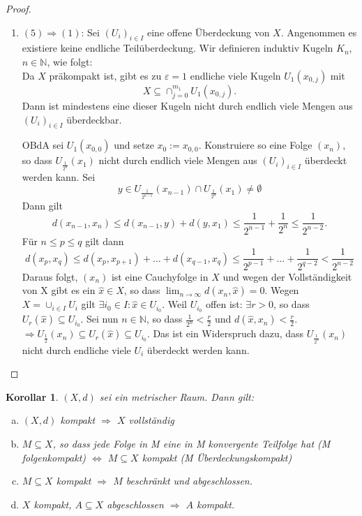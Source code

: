 \documentclass[ngerman]{report}
\theoremstyle{plain}%
\newtheorem{cor}[thm]{Korollar}
\theoremstyle{definition}%
\theoremstyle{myStyle}
\newcommand{\N}{\mathbb{N}}
\newcommand{\df}[1][]{%
	\overset{#1}{\Rightarrow}
}
\newcommand{\limes}[1][\infty]{\lim_{n \to #1}}
\newcommand{\qmarks}[1]{#1}
\begin{document}
\begin{proof}
\begin{enumerate}[]
		\item $(5) \df (1)$: 
			Sei $(U_i)_{i\in I}$ eine offene Überdeckung von $X$.
			Angenommen es existiere keine endliche Teilüberdeckung. Wir definieren induktiv Kugeln $K_n$, $n\in\N$, wie folgt:\\
			Da $X$ präkompakt ist, gibt es zu $\varepsilon = 1$ endliche viele Kugeln $U_1(x_{0,j})$ mit 
				$$X \subseteq \cap_{j=0}^{m_1} U_1(x_{0,j}).$$
			Dann ist mindestens eine dieser Kugeln nicht durch endlich viele Mengen aus $(U_i)_{i\in I}$ überdeckbar.\par
			OBdA sei $U_1(x_{0,0})$ und setze $x_0 := x_{0,0}$. 
			Konstruiere so eine Folge $(x_n)$, so dass $U_{\frac{1}{2^n}}(x_1)$ nicht durch endlich viele Mengen aus $(U_i)_{i\in I}$ überdeckt werden kann. 
			Sei 
				$$y \in U_{\frac{1}{2^{n-1}}}(x_{n-1}) \cap U_{\frac{1}{2^n}}(x_1) \neq \emptyset$$ 
			Dann gilt 
				$$d(x_{n-1},x_n) \leq d(x_{n-1},y) + d(y,x_1) \leq \frac{1}{2^{n-1}} + \frac{1}{2^n} \leq \frac{1}{2^{n-2}}.$$
			Für $n \leq p \leq q$ gilt dann 
				$$d(x_p,x_q) \leq d(x_p,x_{p+1}) + \dots + d(x_{q-1},x_{q})
				\leq \frac{1}{2^{p-1}} + \dots + \frac{1}{2^{q-2}} < \frac{1}{2^{n-2}}$$
			Daraus folgt, $(x_n)$ ist eine Cauchyfolge in $X$ und wegen der Vollständigkeit von X 
			gibt es ein $\hat{x} \in X$, so dass $\limes d(x_n,\hat{x}) = 0$. 
			Wegen $X = \cup_{i\in I} U_i$ gilt $\exists i_0\in I: \hat{x}\in U_{i_0}$.
			Weil $U_{i_0}$ offen ist: $\exists r>0$, so dass $U_r(\hat{x}) \subseteq U_{i_0}$.
			Sei nun $n\in \N$, so dass $\frac{1}{2^n} < \frac{r}{2}$ und $d(\hat{x}, x_n) < \frac{r}{2}$.
			$\df U_{\frac{1}{2}} (x_n) \subseteq U_r(\hat{x}) \subseteq U_{i_0}$. 
			Das ist ein Widerspruch dazu, dass $U_{\frac{1}{2^n}}(x_n)$ nicht durch endliche viele $U_i$ überdeckt werden kann.
		\end{enumerate}
	\end{proof}

	\begin{cor}
		$(X,d)$ sei ein metrischer Raum. Dann gilt:

			\begin{enumerate}[a)]
				\item $(X,d)$ kompakt $\df$ $X$ vollständig
				\item $M\subseteq X$, so dass jede Folge in M eine in M konvergente Teilfolge hat (\qmarks{M folgenkompakt})
					$\Leftrightarrow$ $M \subseteq X$ kompakt (\qmarks{M Überdeckungskompakt})

				\item $M\subseteq X$ kompakt $\df$ $M$ beschränkt und abgeschlossen.
				\item $X$ kompakt, $A \subseteq X$ abgeschlossen $\df$ $A$ kompakt.
			\end{enumerate}
	\end{cor}
\end{document}
